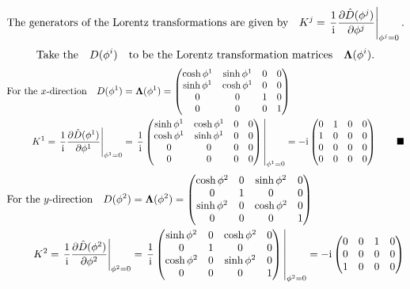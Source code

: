 \documentclass{article}
\begin{document}
\[\qq*{The generators of the Lorentz transformations are given by}K^j=\eval{\frac{1}{\text{i}}\pdv{\hat{D}(\phi^j)}{\phi^j}}_{\phi^j=0}.\]
\[ \qq*{Take the} D(\phi^i) \qq{to be the Lorentz transformation matrices}\vb{\Lambda}(\phi^i).\]
\begin{align*}
\qq*{For the $x$-direction}D(\phi^1)&=\vb{\Lambda}(\phi^1)=\begin{pmatrix}
\cosh{\phi^1}&\sinh{\phi^1}&0&0\\
\sinh{\phi^1}&\cosh{\phi^1} & 0&0 \\ 
0 & 0&1&0\\
0&0&0&1
\end{pmatrix}\\
K^1=\eval{\frac{1}{\text{i}}\pdv{\hat{D}(\phi^1)}{\phi^1}}_{\phi^1=0}&=\eval{\frac{1}{\text{i}}\begin{pmatrix}
		\sinh{\phi^1}&\cosh{\phi^1}&0&0\\
		\cosh{\phi^1}&\sinh{\phi^1} & 0&0 \\ 
		0 & 0&0&0\\
		0&0&0&0
		\end{pmatrix}}_{\phi^1=0}=-\text{i}\begin{pmatrix}
		0&1&0&0\\
		1&0 & 0&0 \\ 
		0 & 0&0&0\\
		0&0&0&0
		\end{pmatrix}\qquad\blacksquare
\end{align*}\begin{align*}
\qq*{For the $y$-direction}D(\phi^2)&=\vb{\Lambda}(\phi^2)=\begin{pmatrix}
\cosh{\phi^2}&0&\sinh{\phi^2}&0\\
0&1 & 0&0 \\ 
\sinh{\phi^2} & 0&\cosh{\phi^2}&0\\
0&0&0&1
\end{pmatrix}\\
K^2=\eval{\frac{1}{\text{i}}\pdv{\hat{D}(\phi^2)}{\phi^2}}_{\phi^2=0}&=\eval{\frac{1}{\text{i}}\begin{pmatrix}
\sinh{\phi^2}&0&\cosh{\phi^2}&0\\
0&1 & 0&0 \\ 
\cosh{\phi^2} & 0&\sinh{\phi^2}&0\\
0&0&0&1
		\end{pmatrix}}_{\phi^2=0}=-\text{i}\begin{pmatrix}
		0&0&1&0\\
		0 & 0&0&0\\
		1&0 & 0&0 \\ 

\end{pmatrix}
\end{align*}
\end{document}
